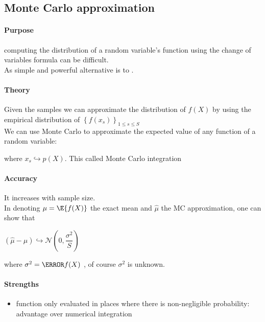 \subsection{Monte Carlo approximation}
\paragraph{Purpose}
computing the distribution of a random variable's function using the change of variables formula can
be difficult.\\
As simple and powerful alternative is to .
\paragraph{Theory}
Given the samples we can approximate the distribution of $f(X)$ by using the empirical 
distribution of $\left\{f(x_{s})\right\}_{1\leq s\leq S}$\\
We can use Monte Carlo to approximate the expected value of any function of a random variable:
\begin{center}
\end{center}
where $x_{s}\hookrightarrow p(X)$. This called Monte Carlo integration
\paragraph{Accuracy}
It increases with sample size.\\
In denoting $\mu = \E{f(X)}$ the exact mean and $\hat{\mu}$ the MC approximation, one can show that
\begin{center}
    $(\hat{\mu} - \mu) \hookrightarrow \mathcal{N}\left(0, \dfrac{\sigma^{2}}{S}\right)$
\end{center}
where $\sigma^{2} = \V{f(X)}$ , of course 
$\sigma^{2}$ is unknown.\\

\paragraph{Strengths}
\begin{itemize}
    \item function only evaluated in places where there is non-negligible probability: advantage over
        numerical integration 
\end{itemize}
